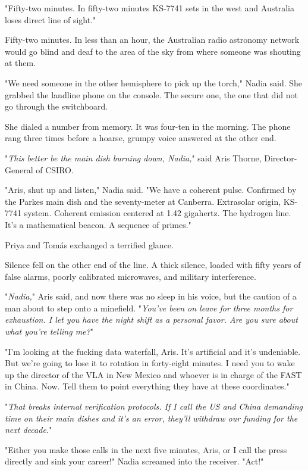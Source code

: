 \documentclass[11pt,a5paper,twoside]{book}
\begin{document}
"Fifty-two minutes. In fifty-two minutes KS-7741 sets in the west and Australia loses direct line of sight."

Fifty-two minutes. In less than an hour, the Australian radio astronomy network would go blind and deaf to the area of the sky from where someone was shouting at them.

"We need someone in the other hemisphere to pick up the torch," Nadia said. She grabbed the landline phone on the console. The secure one, the one that did not go through the switchboard.

She dialed a number from memory. It was four-ten in the morning. The phone rang three times before a hoarse, grumpy voice answered at the other end.

"\textit{This better be the main dish burning down, Nadia,}" said Aris Thorne, Director-General of CSIRO.

"Aris, shut up and listen," Nadia said. "We have a coherent pulse. Confirmed by the Parkes main dish and the seventy-meter at Canberra. Extrasolar origin, KS-7741 system. Coherent emission centered at 1.42 gigahertz. The hydrogen line. It's a mathematical beacon. A sequence of primes."

Priya and Tomás exchanged a terrified glance.

Silence fell on the other end of the line. A thick silence, loaded with fifty years of false alarms, poorly calibrated microwaves, and military interference.

"\textit{Nadia,}" Aris said, and now there was no sleep in his voice, but the caution of a man about to step onto a minefield. "\textit{You've been on leave for three months for exhaustion. I let you have the night shift as a personal favor. Are you sure about what you're telling me?}"

"I'm looking at the fucking data waterfall, Aris. It's artificial and it's undeniable. But we're going to lose it to rotation in forty-eight minutes. I need you to wake up the director of the VLA in New Mexico and whoever is in charge of the FAST in China. Now. Tell them to point everything they have at these coordinates."

"\textit{That breaks internal verification protocols. If I call the US and China demanding time on their main dishes and it's an error, they'll withdraw our funding for the next decade.}"

"Either you make those calls in the next five minutes, Aris, or I call the press directly and sink your career!" Nadia screamed into the receiver. "Act!"
\end{document}
